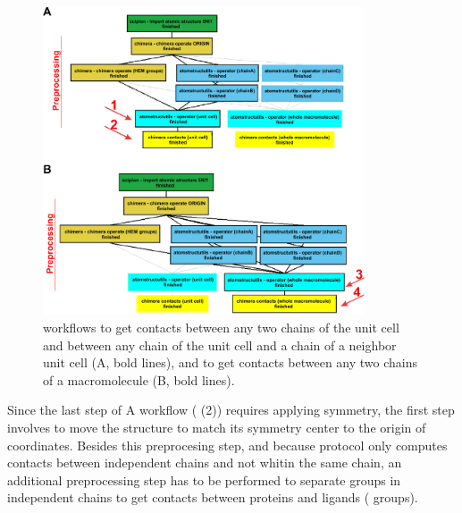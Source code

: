         \begin{figure}[H]
            \centering 
            \captionsetup{width=.7\linewidth} 
            \includegraphics[width=0.85\textwidth]{Images/Fig46}
            \caption{\scipion workflows to get contacts between any two chains of the unit cell and between any chain of the unit cell and a chain of a neighbor unit cell (A, bold lines), and to get contacts between any two chains of a macromolecule (B, bold lines).}
            \label{fig:workflows_contacts}
        \end{figure}
        
Since the last step of A workflow ( (2)) requires applying symmetry, the first step involves to move the structure to match its symmetry center to the origin of coordinates. Besides this preprocesing step, and because protocol  only computes contacts between independent chains and not whitin the same chain, an additional preprocessing step has to be performed to separate  groups in independent chains to get contacts between proteins and ligands ( groups).

